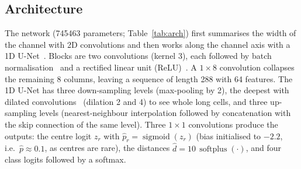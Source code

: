 \documentclass[11pt,a4paper]{article}
\newcommand{\hatp}{\hat p}
\begin{document}
\subsection{Architecture}
The network (\num{745463} parameters; Table~\ref{tab:arch}) first summarises the width of the channel with 2D convolutions and then works along the channel axis with a 1D U-Net~\cite{ronneberger2015}. Blocks are two convolutions (kernel 3), each followed by batch normalisation~\cite{ioffe2015} and a rectified linear unit (ReLU)~\cite{nair2010}. A $1\times 8$ convolution collapses the remaining 8 columns, leaving a sequence of length 288 with 64 features. The 1D U-Net has three down-sampling levels (max-pooling by 2), the deepest with dilated convolutions~\cite{yu2016} (dilation 2 and 4) to see whole long cells, and three up-sampling levels (nearest-neighbour interpolation followed by concatenation with the skip connection of the same level). Three $1\times1$ convolutions produce the outputs: the centre logit $z_r$ with $\hatp_r=\operatorname{sigmoid}(z_r)$ (bias initialised to $-2.2$, i.e.\ $\hatp\approx0.1$, as centres are rare), the distances $\hat d=10\,\operatorname{softplus}(\cdot)$, and four class logits followed by a softmax.

\begin{table}[ht]
\centering\small
\caption{Network layers. $B$: batch, $C$: features, shapes are (features, rows, columns).}
\label{tab:arch}
\end{table}
\end{document}
